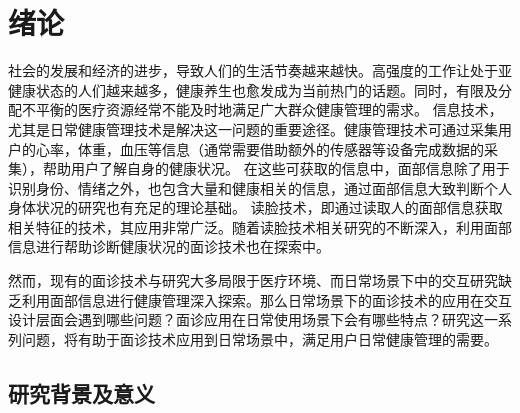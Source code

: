 \chapter{绪论}



社会的发展和经济的进步，导致人们的生活节奏越来越快。高强度的工作让处于亚健康状态的人们越来越多，健康养生也愈发成为当前热门的话题。同时，有限及分配不平衡的医疗资源经常不能及时地满足广大群众健康管理的需求\cite{雷鹏中国医疗资源配置与服务利用现状评价}。
信息技术，尤其是日常健康管理技术是解决这一问题的重要途径。健康管理技术可通过采集用户的心率，体重，血压等信息\cite{Liu2014Computerized, Wang2004An, Shu2007Developing}（通常需要借助额外的传感器等设备完成数据的采集），帮助用户了解自身的健康状况。
在这些可获取的信息中，面部信息除了用于识别身份、情绪之外，也包含大量和健康相关的信息，通过面部信息大致判断个人身体状况的研究也有充足的理论基础\cite{杨淑芳2002伤寒六经辨证初探, Clifford2006Shortliffe}。
读脸技术，即通过读取人的面部信息获取相关特征的技术，其应用非常广泛。随着读脸技术相关研究的不断深入，利用面部信息进行帮助诊断健康状况的面诊技术也在探索中。


然而，现有的面诊技术与研究大多局限于医疗环境、而日常场景下中的交互研究缺乏利用面部信息进行健康管理深入探索。那么日常场景下的面诊技术的应用在交互设计层面会遇到哪些问题？面诊应用在日常使用场景下会有哪些特点？研究这一系列问题，将有助于面诊技术应用到日常场景中，满足用户日常健康管理的需要。


\section{研究背景及意义}

